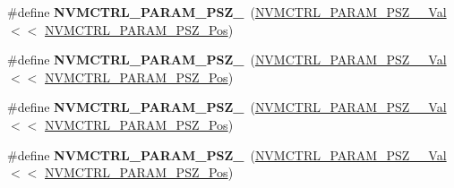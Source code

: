 \begin{DoxyCompactItemize}
\item 
\hypertarget{group___s_a_m_l21___n_v_m_c_t_r_l_ga010ee7c6ad7172ef6b2b7ff5020fa540}{}\#define {\bfseries N\+V\+M\+C\+T\+R\+L\+\_\+\+P\+A\+R\+A\+M\+\_\+\+P\+S\+Z\+\_}~(\hyperlink{group___s_a_m_l21___n_v_m_c_t_r_l_ga464e20508682489f9283f535148c27b1}{N\+V\+M\+C\+T\+R\+L\+\_\+\+P\+A\+R\+A\+M\+\_\+\+P\+S\+Z\+\_\+\_\+\+Val}      $<$$<$ \hyperlink{group___s_a_m_l21___n_v_m_c_t_r_l_gabec5624158a60a0f0d0b8a62afe18af8}{N\+V\+M\+C\+T\+R\+L\+\_\+\+P\+A\+R\+A\+M\+\_\+\+P\+S\+Z\+\_\+\+Pos})\label{group___s_a_m_l21___n_v_m_c_t_r_l_ga010ee7c6ad7172ef6b2b7ff5020fa540}

\item 
\hypertarget{group___s_a_m_l21___n_v_m_c_t_r_l_ga19008e48e571c1882e4476ac5e0a53ab}{}\#define {\bfseries N\+V\+M\+C\+T\+R\+L\+\_\+\+P\+A\+R\+A\+M\+\_\+\+P\+S\+Z\+\_}~(\hyperlink{group___s_a_m_l21___n_v_m_c_t_r_l_gac8f620598445b047b44dfc8081439744}{N\+V\+M\+C\+T\+R\+L\+\_\+\+P\+A\+R\+A\+M\+\_\+\+P\+S\+Z\+\_\+\_\+\+Val}     $<$$<$ \hyperlink{group___s_a_m_l21___n_v_m_c_t_r_l_gabec5624158a60a0f0d0b8a62afe18af8}{N\+V\+M\+C\+T\+R\+L\+\_\+\+P\+A\+R\+A\+M\+\_\+\+P\+S\+Z\+\_\+\+Pos})\label{group___s_a_m_l21___n_v_m_c_t_r_l_ga19008e48e571c1882e4476ac5e0a53ab}

\item 
\hypertarget{group___s_a_m_l21___n_v_m_c_t_r_l_ga4ed90755a60fe915da872cb1151170a9}{}\#define {\bfseries N\+V\+M\+C\+T\+R\+L\+\_\+\+P\+A\+R\+A\+M\+\_\+\+P\+S\+Z\+\_}~(\hyperlink{group___s_a_m_l21___n_v_m_c_t_r_l_ga7f53d9c6161bf83ef35275e90438e9e2}{N\+V\+M\+C\+T\+R\+L\+\_\+\+P\+A\+R\+A\+M\+\_\+\+P\+S\+Z\+\_\+\_\+\+Val}     $<$$<$ \hyperlink{group___s_a_m_l21___n_v_m_c_t_r_l_gabec5624158a60a0f0d0b8a62afe18af8}{N\+V\+M\+C\+T\+R\+L\+\_\+\+P\+A\+R\+A\+M\+\_\+\+P\+S\+Z\+\_\+\+Pos})\label{group___s_a_m_l21___n_v_m_c_t_r_l_ga4ed90755a60fe915da872cb1151170a9}

\item 
\hypertarget{group___s_a_m_l21___n_v_m_c_t_r_l_ga0c5eba0af849936464336787aaa30734}{}\#define {\bfseries N\+V\+M\+C\+T\+R\+L\+\_\+\+P\+A\+R\+A\+M\+\_\+\+P\+S\+Z\+\_}~(\hyperlink{group___s_a_m_l21___n_v_m_c_t_r_l_gac19388a03c011b81e82b35dfd7da69b1}{N\+V\+M\+C\+T\+R\+L\+\_\+\+P\+A\+R\+A\+M\+\_\+\+P\+S\+Z\+\_\+\_\+\+Val}     $<$$<$ \hyperlink{group___s_a_m_l21___n_v_m_c_t_r_l_gabec5624158a60a0f0d0b8a62afe18af8}{N\+V\+M\+C\+T\+R\+L\+\_\+\+P\+A\+R\+A\+M\+\_\+\+P\+S\+Z\+\_\+\+Pos})\label{group___s_a_m_l21___n_v_m_c_t_r_l_ga0c5eba0af849936464336787aaa30734}


\end{DoxyCompactItemize}
